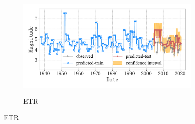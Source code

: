 \begin{figure}[!htbp]
\begin{subfigure}[b]{0.45\textwidth}
    \vspace{-1cm}
    \label{fig:seism_knn_minyear_1932_maxyear_2021_spanlat_2_spanlon_4_timewindow_72_nextmonth_12_minmag_3.0_block_4}
  \end{subfigure}
  ~
  \begin{subfigure}[b]{0.45\textwidth}
    \caption{ETR}
    \vspace{-0.2cm}
    \includegraphics[width=\textwidth]{Img/chap5_seism/block4/seism_etr_minyear_1932_maxyear_2021_spanlat_2_spanlon_4_timewindow_72_nextmonth_12_minmag_3.0_block_4.pdf}
    \vspace{-1cm}
    \label{fig:seism_etr_minyear_1932_maxyear_2021_spanlat_2_spanlon_4_timewindow_72_nextmonth_12_minmag_3.0_block_4}
  \end{subfigure}
  \label{fig:seism_minyear_1932_maxyear_2021_spanlat_2_spanlon_4_timewindow_72_nextmonth_12_minmag_3.0_block_4}
\end{figure}

